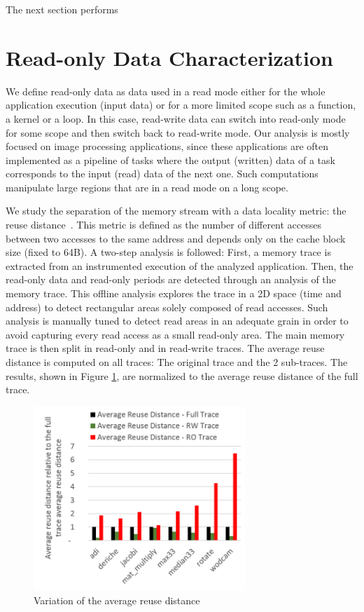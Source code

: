 \documentclass[sigconf]{acmart}
\begin{document}
The next section performs 

\section{Read-only Data Characterization}


We define read-only data as data used in a read mode either for the whole application execution (input data) or for a more limited scope such as a function, a kernel or a loop. In this case, read-write data can switch into read-only mode for some scope and then switch back to read-write mode. Our analysis is mostly focused on image processing applications, since these applications are often implemented as a pipeline of tasks where the output (written) data of a task corresponds to the input (read) data of the next one. Such computations manipulate large regions that are in a read mode on a long scope.

We study the separation of the memory stream with a data locality metric: the reuse distance~\cite{Coffman:1973}. This metric is defined as the number of different accesses between two accesses to the same address and depends only on the cache block size (fixed to 64B). A two-step analysis is followed: First, a memory trace is extracted from an instrumented execution of the analyzed application. Then, the read-only data and read-only periods are detected through an analysis of the memory trace. This offline analysis explores the trace in a 2D space (time and address) to detect rectangular areas solely composed of read accesses. Such analysis is manually tuned to detect read areas in an adequate grain in order to avoid capturing every read access as a small read-only area. The main memory trace is then split in read-only and in read-write traces. The average reuse distance is computed on all traces: The original trace and the 2 sub-traces. The results, shown in Figure \ref{stackdistance}, are normalized to the average reuse distance of the full trace.


\begin{figure}
    \centering
    \includegraphics[width=8cm]{./images/stackdistance.png}
     \caption{Variation of the average reuse distance}
    \label{stackdistance}
\end{figure}
\end{document}
